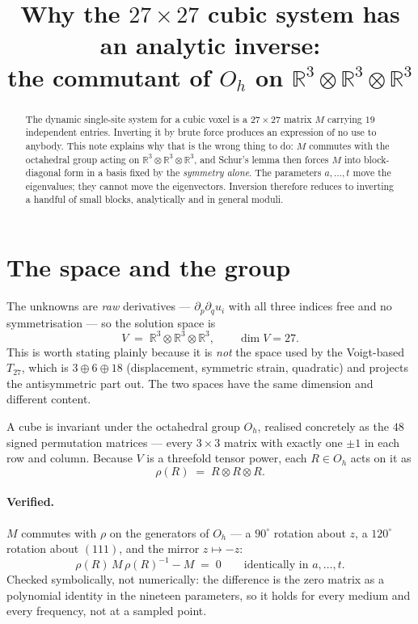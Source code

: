 \documentclass[11pt]{article}
\title{Why the $27\times27$ cubic system has an analytic inverse:\\
       the commutant of $O_h$ on $\mathbb{R}^3\otimes\mathbb{R}^3\otimes\mathbb{R}^3$}
\author{}
\date{}
\begin{document}
\maketitle

\begin{abstract}
The dynamic single-site system for a cubic voxel is a $27\times27$ matrix $M$
carrying $19$ independent entries. Inverting it by brute force produces an
expression of no use to anybody. This note explains why that is the wrong thing
to do: $M$ commutes with the octahedral group acting on
$\mathbb{R}^3\otimes\mathbb{R}^3\otimes\mathbb{R}^3$, and Schur's lemma then
forces $M$ into block-diagonal form in a basis fixed by the \emph{symmetry
alone}. The parameters $a,\dots,t$ move the eigenvalues; they cannot move the
eigenvectors. Inversion therefore reduces to inverting a handful of small
blocks, analytically and in general moduli.
\end{abstract}

\section{The space and the group}

The unknowns are \emph{raw} derivatives --- $\partial_p\partial_q u_i$ with all
three indices free and no symmetrisation --- so the solution space is
\[
  V \;=\; \mathbb{R}^3\otimes\mathbb{R}^3\otimes\mathbb{R}^3,
  \qquad \dim V = 27 .
\]
This is worth stating plainly because it is \emph{not} the space used by the
Voigt-based $T_{27}$, which is $3\oplus6\oplus18$ (displacement, symmetric
strain, quadratic) and projects the antisymmetric part out. The two spaces have
the same dimension and different content.

A cube is invariant under the octahedral group $O_h$, realised concretely as the
$48$ signed permutation matrices --- every $3\times3$ matrix with exactly one
$\pm1$ in each row and column. Because $V$ is a threefold tensor power, each
$R\in O_h$ acts on it as
\[
  \rho(R) \;=\; R\otimes R\otimes R .
\]

\paragraph{Verified.} $M$ commutes with $\rho$ on the generators of $O_h$ --- a
$90^\circ$ rotation about $z$, a $120^\circ$ rotation about $(111)$, and the
mirror $z\mapsto-z$:
\[
  \rho(R)\,M\,\rho(R)^{-1} - M \;=\; 0
  \qquad\text{identically in } a,\dots,t .
\]
Checked symbolically, not numerically: the difference is the zero matrix as a
polynomial identity in the nineteen parameters, so it holds for every medium and
every frequency, not at a sampled point.
\end{document}
